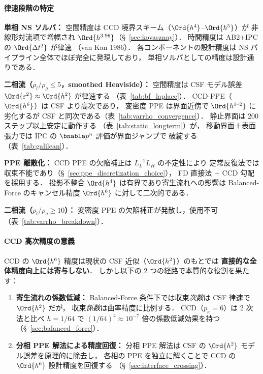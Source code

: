\paragraph{律速段階の特定}
\label{sec:accuracy_summary}

\noindent\textbf{単相 NS ソルバ：}
空間精度は CCD 境界スキーム（$\Ord{h^4}$--$\Ord{h^5}$）が
非線形対流項で増幅され $\Ord{h^{3.96}}$（§~\ref{sec:kovasznay}）．
時間精度は AB2+IPC の $\Ord{\Delta t^2}$ が律速
（van Kan 1986）．
各コンポーネントの設計精度は NS パイプライン全体でほぼ完全に発現しており，
単相ソルバとしての精度は設計通りである．

\noindent\textbf{二相流（$\rho_l/\rho_g \leq 5$，smoothed Heaviside）：}
空間精度は CSF モデル誤差 $\Ord{\varepsilon^2} \approx \Ord{h^2}$ が律速する
（表~\ref{tab:bf_laplace}）．
CCD-PPE（$\Ord{h^6}$）は CSF より高次であり，
変密度 PPE は界面近傍で $\Ord{h^{1\text{--}2}}$ に劣化するが
CSF と同次である（表~\ref{tab:varrho_convergence}）．
静止界面は 200 ステップ以上安定に動作する
（表~\ref{tab:static_longterm}）が，
移動界面＋表面張力では IPC の $\bnabla p^n$ 評価が界面ジャンプで
破綻する（表~\ref{tab:galilean}）．

\noindent\textbf{PPE 離散化：}
CCD PPE の欠陥補正は $L_L^{-1} L_H$ の不定性により
定常反復法では収束不能であり（§~\ref{sec:ppe_discretization_choice}），
FD 直接法 + CCD 勾配を採用する．
投影不整合 $\Ord{h^4}$ は有界であり寄生流れへの影響は
Balanced-Force のキャンセル精度 $\Ord{h^6}$ に対して二次的である．

\noindent\textbf{二相流（$\rho_l/\rho_g \geq 10$）：}
変密度 PPE の欠陥補正が発散し，使用不可（表~\ref{tab:varrho_breakdown}）．

\paragraph{CCD 高次精度の意義}

CCD の $\Ord{h^6}$ 精度は現状の CSF 近似（$\Ord{h^2}$）のもとでは
\textbf{直接的な全体精度向上には寄与しない}．
しかし以下の 2 つの経路で本質的な役割を果たす：
\begin{enumerate}[noitemsep]
  \item \textbf{寄生流れの係数低減：}
        Balanced-Force 条件下では収束\textit{次数}は CSF 律速で $\Ord{h^2}$ だが，
        収束\textit{係数}は曲率精度に比例する．
        CCD（$p_\kappa = 6$）は 2 次法と比べ $h = 1/64$ で
        $(1/64)^4 \approx 10^{-7}$ 倍の係数低減効果を持つ
        （§~\ref{sec:balanced_force}）．
  \item \textbf{分相 PPE 解法による精度回復：}
        分相 PPE 解法は CSF の $\Ord{h^2}$ モデル誤差を原理的に除去し，
        各相の PPE を独立に解くことで
        CCD の $\Ord{h^6}$ 設計精度を回復する
        （§~\ref{sec:interface_crossing}）．
\end{enumerate}

